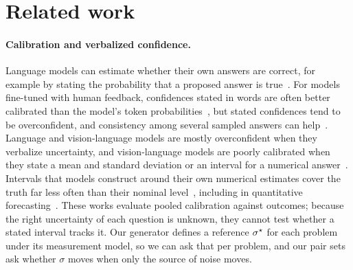 \section{Related work}
\label{sec:related}

\paragraph{Calibration and verbalized confidence.}
Language models can estimate whether their own answers are correct, for example by stating the probability that a
proposed answer is true~\citep{kadavath2022know}.
For models fine-tuned with human feedback, confidences stated in words are often better calibrated than the model's
token probabilities~\citep{tian2023justask}, but stated confidences tend to be overconfident, and consistency among
several sampled answers can help~\citep{xiong2024express}.
Language and vision-language models are mostly overconfident when they verbalize uncertainty, and vision-language
models are poorly calibrated when they state a mean and standard deviation or an interval for a numerical
answer~\citep{groot2024overconfidence}.
Intervals that models construct around their own numerical estimates cover the truth far less often than their
nominal level~\citep{epstein2025fermieval}, including in quantitative forecasting~\citep{qin2026quantsight}.
These works evaluate pooled calibration against outcomes; because the right uncertainty of each question is unknown,
they cannot test whether a stated interval tracks it.
Our generator defines a reference $\sigma^{\star}$ for each problem under its measurement model, so we can ask that per
problem, and our pair sets ask whether $\sigma$
moves when only the source of noise moves.

